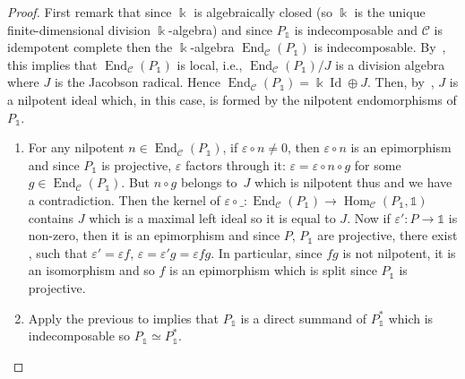 \documentclass[10pt,a4paper]{amsart}
\numberwithin{equation}{section}
\newcommand{\tto}{\xrightarrow}
\numberwithin{theorem}{section}
\numberwithin{proposition}{section}
\numberwithin{definition}{section}
\numberwithin{lemma}{section}
\numberwithin{corollary}{section}
\numberwithin{remark}{section}
\numberwithin{example}{section}
\newcommand{\cat}{\mathcal{C}}
\newcommand{\End}{\operatorname{End}}
\newcommand{\Hom}{\operatorname{Hom}}
\newcommand{\unit}{\ensuremath{\mathds{1}}}
\newcommand{\Id}{\operatorname{Id}}
\newcommand{\FK}{{\Bbbk}}
\newcommand{\ve}{\varepsilon}
\begin{document}
\begin{proof}
 First remark that since $\FK$ is algebraically closed (so
 $\FK$ is the unique finite-dimensional division $\FK$-algebra) and
 since $P_\unit$ is indecomposable
 and $\cat$ is idempotent complete then the $\FK$-algebra
 $\End_\cat(P_\unit)$ is indecomposable. By~\cite[Theorem~3.2.2]{DK94},
 this implies that $\End_\cat(P_\unit)$ is local, i.e.,
 $\End_\cat(P_\unit)/J$ is a division algebra where $J$ is the
 Jacobson radical. Hence $\End_\cat(P_\unit)=\FK\Id\oplus J$. Then,
 by~\cite[Proposition 3.1.9]{DK94}, $J$ is a nilpotent ideal which,
 in this case, is formed by the nilpotent endomorphisms of $P_\unit$.
 \begin{enumerate}\itemsep=0pt
 \item For any nilpotent $n\in\End_\cat(P_\unit)$, if
 $\ve\circ n\neq 0$, then $\ve\circ n$ is an epimorphism and since
 $P_\unit$ is projective, $\ve$ factors through it:
 $\ve=\ve\circ n\circ g$ for some $g\in\End_\cat(P_\unit)$. But
 $n\circ g$ belongs to~$J$ which is nilpotent thus
 \smash{$\ve=\ve\circ(n\circ g)^{\dim_\FK(J)}=0$}
 and we have a contradiction. Then the kernel of
 $\ve\circ\_
 \colon \End_\cat(P_\unit)\to\Hom_\cat(P_\unit,\unit)$
 contains $J$ which is a maximal left
 ideal so it is equal to $J$. Now if $\ve'\colon P\to\unit$ is non-zero, then it is an epimorphism and since $P$, $P_\unit$ are
 projective, there exist \smash{$P\tto fP_\unit$}, \smash{$P_\unit\tto gP$} such that
 $\ve'=\ve f$, $\ve=\ve'g=\ve fg$. In particular, since $fg$ is not
 nilpotent, it is an isomorphism and so $f$ is an epimorphism which
 is split since $P_\unit$ is projective.

 \item Apply the previous to \smash{$P_\unit^*\tto{\eta^*}\unit$} implies
 that $P_\unit$ is a direct summand of $P_\unit^*$ which is
 indecomposable so $P_\unit\simeq P_\unit^*$.


\end{enumerate}
\end{proof}
\end{document}
